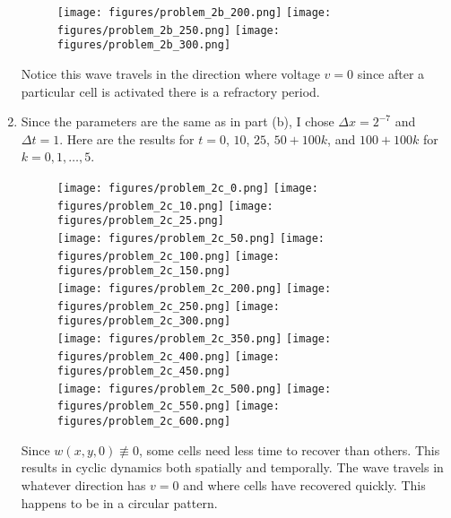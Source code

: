 \documentclass{article} %
\theoremstyle{plain}
\newcommand{\Dx}{\Delta x}
\newcommand{\Dt}{\Delta t}
\numberwithin{equation}{section} %
\numberwithin{figure}{section} %
\numberwithin{table}{section} %
\begin{document}
\begin{enumerate}[\ \ (a)]
\begin{figure}[ht!]
        \texttt{[image: figures/problem\_2b\_200.png]} \hfill \texttt{[image: figures/problem\_2b\_250.png]} \hfill \texttt{[image: figures/problem\_2b\_300.png]}
        \end{figure}
        \FloatBarrier
        Notice this wave travels in the direction where voltage $v = 0$ since after a particular cell is activated there is a refractory period.
        \pagebreak
    \item
        Since the parameters are the same as in part (b), I chose $\Dx = 2^{-7}$ and $\Dt = 1$.  Here are the results for $t = 0$, $10$, $25$, $50 + 100k$, and $100 + 100k$ for $k = 0,1,\dots, 5$.
        \begin{figure}[ht!]
        \texttt{[image: figures/problem\_2c\_0.png]} \hfill \texttt{[image: figures/problem\_2c\_10.png]} \hfill \texttt{[image: figures/problem\_2c\_25.png]} \\
        \texttt{[image: figures/problem\_2c\_50.png]} \hfill \texttt{[image: figures/problem\_2c\_100.png]} \hfill \texttt{[image: figures/problem\_2c\_150.png]} \\
        \texttt{[image: figures/problem\_2c\_200.png]} \hfill \texttt{[image: figures/problem\_2c\_250.png]} \hfill \texttt{[image: figures/problem\_2c\_300.png]} \\
        \texttt{[image: figures/problem\_2c\_350.png]} \hfill \texttt{[image: figures/problem\_2c\_400.png]} \hfill \texttt{[image: figures/problem\_2c\_450.png]} \\
        \hfill \texttt{[image: figures/problem\_2c\_500.png]} \hfill \texttt{[image: figures/problem\_2c\_550.png]} \hfill \texttt{[image: figures/problem\_2c\_600.png]}
        \end{figure}
        \FloatBarrier
        Since $w(x,y,0) \not\equiv 0$, some cells need less time to recover than others.  This results in cyclic dynamics both spatially and temporally.  The wave travels in whatever direction has $v = 0$ and where cells have recovered quickly.  This happens to be in a circular pattern.

\end{enumerate}
\end{document}
